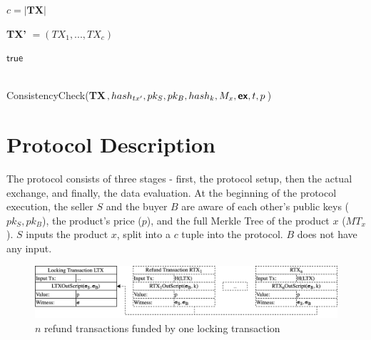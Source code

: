 \documentclass{cacthesis}
\newcounter{protocol}
\begin{document}
        \begin{center}
        \begin{minipage}[t]{4in}
            \begin{algorithm}[H]
                $c = |\textbf{TX}|$\;
                
                \textbf{TX'} $ = ( TX_1, ..., TX_c)$\;
                
                \Return $\textsf{true}$\;
                
                \caption{\\\mbox{\textsf{ConsistencyCheck(}\textbf{TX}\textsf{$, hash_{tx'}, pk_S, pk_B, hash_{k}, M_x, \textbf{\textsf{ex}}, t, p$)}}}
            \end{algorithm}
        \end{minipage}    
        \end{center}
        
        \newpage
        
        \section{Protocol Description}
        The protocol consists of three stages - first, the protocol setup, then the actual exchange, and finally, the data evaluation. 
        At the beginning of the protocol execution, the seller $S$ and the buyer $B$ are aware of each other's public keys ($pk_S, pk_B$), the product's price ($p$), and the full Merkle Tree of the product $x$ ($MT_x$). $S$ inputs the product $x$, split into a $c$ tuple into the protocol. $B$ does not have any input.

        
        
        \begin{figure}
            \begin{center}
                \includegraphics[width=\textwidth]{images/locking_refund_tx_figure.png}
              \caption{$n$ refund transactions funded by one locking transaction}
              \label{fig:lockingRefundTx}
            \end{center}
            \end{figure}
            
\end{document}
